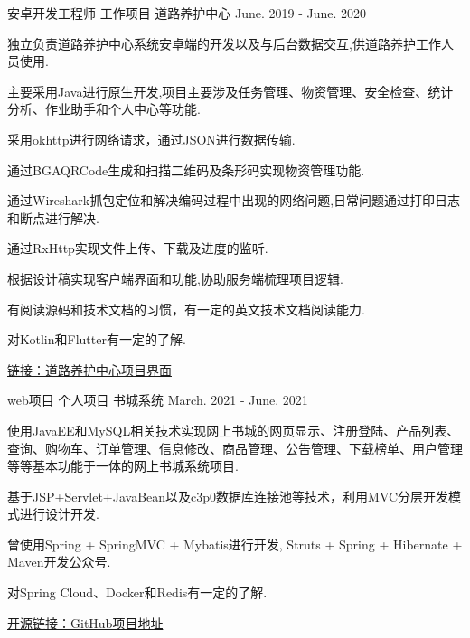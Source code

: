 

\begin{cventries}

  \cventry
    {安卓开发工程师} %
    {工作项目} %
    {道路养护中心} %
    {June. 2019 - June. 2020} %
    {
      \begin{cvitems} %
        \item {独立负责道路养护中心系统安卓端的开发以及与后台数据交互,供道路养护工作人员使用.}
        \item {主要采用Java进行原生开发,项目主要涉及任务管理、物资管理、安全检查、统计分析、作业助手和个人中心等功能.}
        \item {采用okhttp进行网络请求，通过JSON进行数据传输.} 
        \item {通过BGAQRCode生成和扫描二维码及条形码实现物资管理功能.} 
        \item {通过Wireshark抓包定位和解决编码过程中出现的网络问题,日常问题通过打印日志和断点进行解决.}
        \item {通过RxHttp实现文件上传、下载及进度的监听.}   
        \item {根据设计稿实现客户端界面和功能,协助服务端梳理项目逻辑.}  
        \item {有阅读源码和技术文档的习惯，有一定的英文技术文档阅读能力.} 
        \item {对Kotlin和Flutter有一定的了解.} 
        \item {\href{https://org.modao.cc/app/255ca15c8c6f06add68dad7743ee69a509f3be46}{链接：道路养护中心项目界面}}    
      \end{cvitems}
    }

  \cventry
    {web项目} %
    {个人项目} %
    {书城系统} %
    {March. 2021 - June. 2021} %
    {
      \begin{cvitems} %
        \item {使用JavaEE和MySQL相关技术实现网上书城的网页显示、注册登陆、产品列表、查询、购物车、订单管理、信息修改、商品管理、公告管理、下载榜单、用户管理等等基本功能于一体的网上书城系统项目.}           
        \item {基于JSP+Servlet+JavaBean以及c3p0数据库连接池等技术，利用MVC分层开发模式进行设计开发.}
        \item {曾使用Spring + SpringMVC + Mybatis进行开发, Struts + Spring + Hibernate + Maven开发公众号.}
        \item {对Spring Cloud、Docker和Redis有一定的了解.}
        \item {\href{https://github.com/zhoudexi/BookStore}{开源链接：GitHub项目地址}}
      \end{cvitems}
    }


\end{cventries}
